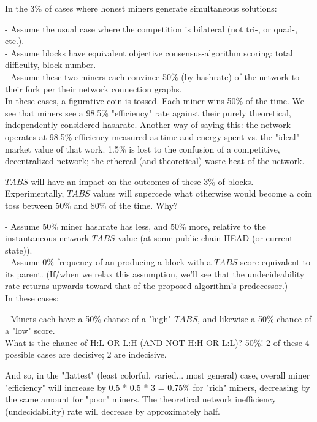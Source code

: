 \documentclass[11pt]{article}
\theoremstyle{plain}
\begin{document}
{In the 3\% of cases where honest miners generate simultaneous solutions:

- Assume the usual case where the competition is bilateral (not tri-, or quad-,
etc.). \\
- Assume blocks have equivalent objective consensus-algorithm scoring: total
difficulty, block number. \\
- Assume these two miners each convince 50\% (by hashrate) of the network to
their fork per their network connection graphs. \\

In these cases, a figurative coin is tossed. Each miner wins 50\% of the time.
We see that miners see a 98.5\% "efficiency" rate against their purely
theoretical, independently-considered hashrate.
Another way of saying this: the network operates at 98.5\% efficiency measured
as time and energy spent vs. the "ideal" market value of that work.
1.5\% is lost to the confusion of a competitive, decentralized network; the
ethereal (and theoretical) waste heat of the network.

$TABS$ will have an impact on the outcomes of these 3\% of blocks.
Experimentally, $TABS$ values will supercede what otherwise would become a coin
toss between 50\% and 80\% of the time.
Why?

- Assume 50\% miner hashrate has less, and 50\% more, relative to the
instantaneous network $TABS$ value (at some public chain HEAD (or current
state)). \\
- Assume 0\% frequency of an producing a block with a $TABS$ score equivalent
to its parent. (If/when we relax this assumption, we'll see that the
undecideability rate returns upwards toward that of the proposed algorithm's
predecessor.) \\

In these cases:

- Miners each have a 50\% chance of a "high" $TABS$, and likewise a 50\% chance
of a "low" score. \\

What is the chance of H:L OR L:H (AND NOT H:H OR L:L)? 50\%! 2 of these 4
possible cases are decisive; 2 are indecisive.

And so, in the "flattest" (least colorful, varied... most general) case,
overall miner "efficiency" will increase by 0.5 * 0.5 * 3 = 0.75\% for "rich"
miners, decreasing by the same amount for "poor" miners.
The theoretical network inefficiency (undecidability) rate will decrease by
approximately half.


}
\end{document}

